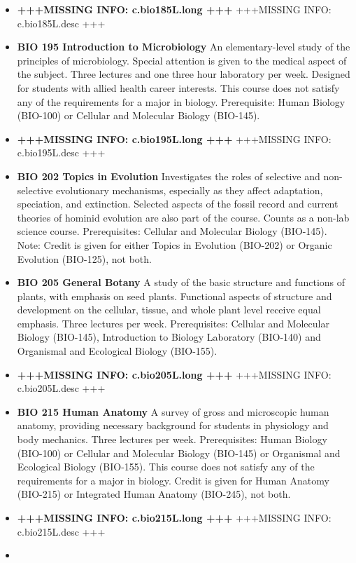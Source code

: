 \documentclass[
  letterpaper,
]{scrbook}
\begin{document}
\begin{itemize}
\item
  \textbf{+++MISSING INFO: c.bio185L.long +++} +++MISSING INFO:
  c.bio185L.desc +++
\item
  \textbf{BIO 195 Introduction to Microbiology} An elementary-level
  study of the principles of microbiology. Special attention is given to
  the medical aspect of the subject. Three lectures and one three hour
  laboratory per week. Designed for students with allied health career
  interests. This course does not satisfy any of the requirements for a
  major in biology. Prerequisite: Human Biology (BIO-100) or Cellular
  and Molecular Biology (BIO-145).
\item
  \textbf{+++MISSING INFO: c.bio195L.long +++} +++MISSING INFO:
  c.bio195L.desc +++
\item
  \textbf{BIO 202 Topics in Evolution} Investigates the roles of
  selective and non-selective evolutionary mechanisms, especially as
  they affect adaptation, speciation, and extinction. Selected aspects
  of the fossil record and current theories of hominid evolution are
  also part of the course. Counts as a non-lab science course.
  Prerequisites: Cellular and Molecular Biology (BIO-145). Note: Credit
  is given for either Topics in Evolution (BIO-202) or Organic Evolution
  (BIO-125), not both.
\item
  \textbf{BIO 205 General Botany} A study of the basic structure and
  functions of plants, with emphasis on seed plants. Functional aspects
  of structure and development on the cellular, tissue, and whole plant
  level receive equal emphasis. Three lectures per week. Prerequisites:
  Cellular and Molecular Biology (BIO-145), Introduction to Biology
  Laboratory (BIO-140) and Organismal and Ecological Biology (BIO-155).
\item
  \textbf{+++MISSING INFO: c.bio205L.long +++} +++MISSING INFO:
  c.bio205L.desc +++
\item
  \textbf{BIO 215 Human Anatomy} A survey of gross and microscopic human
  anatomy, providing necessary background for students in physiology and
  body mechanics. Three lectures per week. Prerequisites: Human Biology
  (BIO-100) or Cellular and Molecular Biology (BIO-145) or Organismal
  and Ecological Biology (BIO-155). This course does not satisfy any of
  the requirements for a major in biology. Credit is given for Human
  Anatomy (BIO-215) or Integrated Human Anatomy (BIO-245), not both.
\item
  \textbf{+++MISSING INFO: c.bio215L.long +++} +++MISSING INFO:
  c.bio215L.desc +++
\item

\end{itemize}
\end{document}
